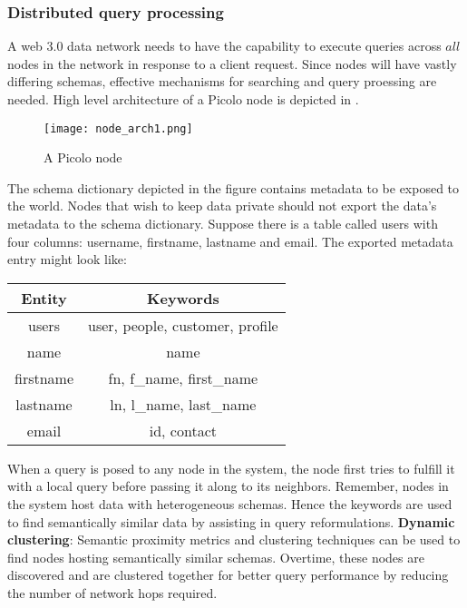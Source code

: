 \subsubsection{Distributed query processing} \label{sec:dynamic_cluster}
A web 3.0 data network needs to have the capability to execute queries across $all$ nodes in the network in response to a client request. Since nodes will have vastly differing schemas, effective mechanisms for searching and query proessing \cite{query_reformulation, query_processing1, query_processing2} are needed. High level architecture of a \textsf{Picolo} node is depicted in .
\begin{figure}[h!] \centering
	\texttt{[image: node\_arch1.png]}
	\caption{A \textsf{Picolo} node}
	\label{fig:node_arch}
\end{figure}
The schema dictionary depicted in the figure contains metadata to be exposed to the world. Nodes that wish to keep data private should not export the data's metadata to the schema dictionary. Suppose there is a table called \textsf{users} with four columns: \textsf{username}, \textsf{firstname}, \textsf{lastname} and \textsf{email}. The exported metadata entry might look like:
\begin{center}
	\begin{tabular}{| c | c |} 
		\hline
		Entity & Keywords \\ [0.5ex] 
		\hline
		\textsf{users} & user, people, customer, profile\\ 
		\hline
		\textsf{name} & name \\
		\hline
		\textsf{firstname} & fn, {f\_name}, {first\_name} \\
		\hline
		\textsf{lastname} & ln, {l\_name}, {last\_name} \\
		\hline
		\textsf{email} & id, contact \\ [1ex] 
		\hline
	\end{tabular}
\end{center}
When a query is posed to any node in the system, the node first tries to fulfill it with a local query before passing it along to its neighbors. Remember, nodes in the system host data with heterogeneous schemas. Hence the keywords are used to find semantically similar data by assisting in query reformulations.
\newline\newline
\textbf{Dynamic clustering}:
Semantic proximity metrics \cite{PeerDB} and clustering techniques \cite{dynamic_clustering} can be used to find nodes hosting semantically similar schemas. Overtime, these nodes are discovered and are clustered together for better query performance by reducing the number of network hops required.

